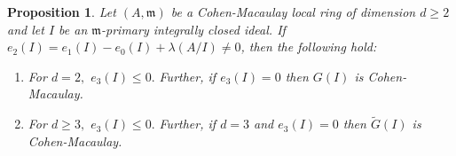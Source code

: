 \documentclass[11pt]{amsart}
\theoremstyle{plain}
\newtheorem{proposition}[theorem]{Proposition}
\newcommand{\m}{\mathfrak{m}}
\newcommand{\wt}{\widetilde}
\theoremstyle{plain}
\begin{document}
\begin{proposition}\label{e3bd}
Let $(A,\m) $ be a Cohen-Macaulay local ring of dimension $d \geq 2$ and let $I$ be an $\m$-primary integrally closed ideal. If $e_2(I)=e_1(I)-e_0(I)+\lambda(A/I)\neq 0$, then the following hold:
\begin{enumerate} [\normalfont(i)]
    \item \label{e3bd(i)} For $d=2,$ $e_3(I)\leq 0.$ Further, if  $e_3(I)=0$ then $G(I)$ is Cohen-Macaulay.

    \item \label{e3bd(ii)} For $d\geq 3,$ $e_3(I)\leq 0.$ Further, if $d=3$ and $e_3(I)=0$ then $\wt{G}(I)$ is Cohen-Macaulay. %
\end{enumerate}
\end{proposition}
\end{document}
